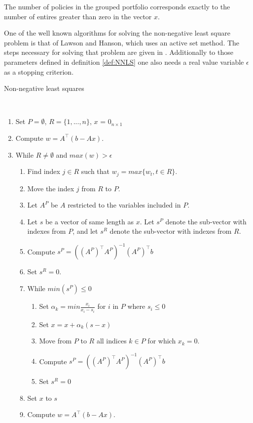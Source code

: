 \begin{remark}
	The number of policies in the grouped portfolio corresponds exactly to the number of entires greater than zero in the vector $x$.
\end{remark}

One of the well known algorithms for solving the non-negative least square problem is that of Lawson and Hanson, which uses an active set method. The steps necessary for solving that problem are given in \cite{lawson}. Additionally to those parameters defined in definition \ref{def:NNLS} one also needs a real value variable $\epsilon$ as a stopping criterion.

\begin{algorithm}
	\caption{Non-negative least squares \cite{lawson}}\label{alg:NNLS}
	\begin{algorithmic}
		\\
		\begin{enumerate}
			\item Set $P = \emptyset$, $R = \{1, ..., n\}$, $x$ = $0_{n \times 1}$
			\item Compute $w = A^\top(b - Ax)$.
			\item While $R \neq \emptyset$ and $max(w) > \epsilon$
			\begin{enumerate}[label=\emph{\alph*})]
				\item Find index $j \in R$ such that $w_j = max\{w_t, t \in R\}$.
				\item Move the index $j$ from $R$ to $P$.
				\item Let $A^P$ be $A$ restricted to the variables included in $P$.
				\item Let $s$ be a vector of same length as $x$. Let $s^P$ denote the sub-vector with indexes from $P$, and let $s^R$ denote the sub-vector with indexes from $R$.
				\item Compute $s^P = ((A^P)^\top A^P)^{-1} (A^P)^\top b$
				\item Set $s^R = 0$.
				\item While $min(s^P) \leq 0$
				\begin{enumerate}
					\item Set $\alpha_k = min\frac{x_i}{x_i - s_i}$ for $i$ in $P$ where $s_i \leq 0$
					\item Set $x = x + \alpha_k(s-x)$
					\item Move from $P$ to $R$ all indices $k \in P$ for which $x_k = 0$.
					\item Compute $s^P = ((A^P)^\top A^P)^{-1} (A^P)^\top b$
					\item Set $s^R = 0$
				\end{enumerate}
				\item Set $x$ to $s$
				\item Compute $w = A^\top(b - Ax)$.
			\end{enumerate}
		\end{enumerate}
	\end{algorithmic}
\end{algorithm}

